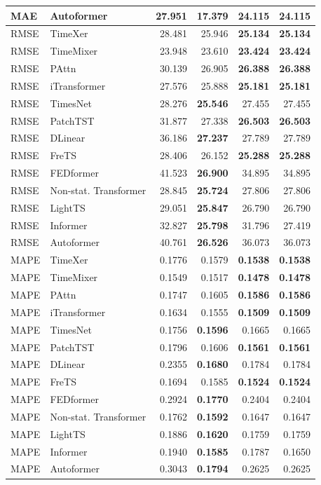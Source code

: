 \begin{longtable}{llrrrr}
MAE & Autoformer & 27.951 & \textbf{17.379} & 24.115 & 24.115 \\
\midrule
RMSE & TimeXer & 28.481 & 25.946 & \textbf{25.134} & \textbf{25.134} \\
RMSE & TimeMixer & 23.948 & 23.610 & \textbf{23.424} & \textbf{23.424} \\
RMSE & PAttn & 30.139 & 26.905 & \textbf{26.388} & \textbf{26.388} \\
RMSE & iTransformer & 27.576 & 25.888 & \textbf{25.181} & \textbf{25.181} \\
RMSE & TimesNet & 28.276 & \textbf{25.546} & 27.455 & 27.455 \\
RMSE & PatchTST & 31.877 & 27.338 & \textbf{26.503} & \textbf{26.503} \\
RMSE & DLinear & 36.186 & \textbf{27.237} & 27.789 & 27.789 \\
RMSE & FreTS & 28.406 & 26.152 & \textbf{25.288} & \textbf{25.288} \\
RMSE & FEDformer & 41.523 & \textbf{26.900} & 34.895 & 34.895 \\
RMSE & Non-stat. Transformer & 28.845 & \textbf{25.724} & 27.806 & 27.806 \\
RMSE & LightTS & 29.051 & \textbf{25.847} & 26.790 & 26.790 \\
RMSE & Informer & 32.827 & \textbf{25.798} & 31.796 & 27.419 \\
RMSE & Autoformer & 40.761 & \textbf{26.526} & 36.073 & 36.073 \\
\midrule
MAPE & TimeXer & 0.1776 & 0.1579 & \textbf{0.1538} & \textbf{0.1538} \\
MAPE & TimeMixer & 0.1549 & 0.1517 & \textbf{0.1478} & \textbf{0.1478} \\
MAPE & PAttn & 0.1747 & 0.1605 & \textbf{0.1586} & \textbf{0.1586} \\
MAPE & iTransformer & 0.1634 & 0.1555 & \textbf{0.1509} & \textbf{0.1509} \\
MAPE & TimesNet & 0.1756 & \textbf{0.1596} & 0.1665 & 0.1665 \\
MAPE & PatchTST & 0.1796 & 0.1606 & \textbf{0.1561} & \textbf{0.1561} \\
MAPE & DLinear & 0.2355 & \textbf{0.1680} & 0.1784 & 0.1784 \\
MAPE & FreTS & 0.1694 & 0.1585 & \textbf{0.1524} & \textbf{0.1524} \\
MAPE & FEDformer & 0.2924 & \textbf{0.1770} & 0.2404 & 0.2404 \\
MAPE & Non-stat. Transformer & 0.1762 & \textbf{0.1592} & 0.1647 & 0.1647 \\
MAPE & LightTS & 0.1886 & \textbf{0.1620} & 0.1759 & 0.1759 \\
MAPE & Informer & 0.1940 & \textbf{0.1585} & 0.1787 & 0.1650 \\
MAPE & Autoformer & 0.3043 & \textbf{0.1794} & 0.2625 & 0.2625 \\
\end{longtable}
\endgroup

